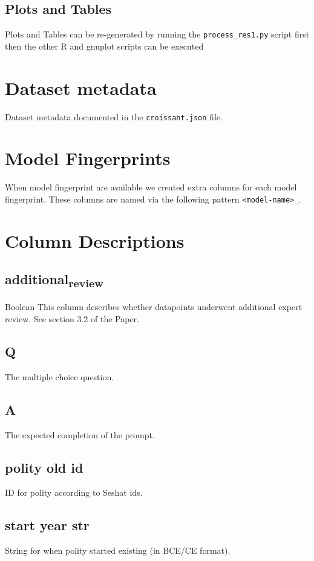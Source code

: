 \documentclass[11pt]{article}
\begin{document}
\subsection*{Plots and Tables}
\label{sec:org72fd3fe}
Plots and Tables can be re-generated by running the \texttt{process\_res1.py}  script first then the other R and gnuplot scripts can be executed

\section*{Dataset metadata}
\label{sec:org615ccbe}
Dataset metadata documented in the \texttt{croissant.json} file.

\section*{Model Fingerprints}
\label{sec:orgab60e90}
When model fingerprint are available we created extra columns for each model fingerprint. These columns are named via the following pattern \texttt{<model-name>\_<model-fingerprint>}.

\section*{Column Descriptions}
\label{sec:org6cd623f}
\subsection*{additional\textsubscript{review}}
\label{sec:org437a392}
Boolean
This column describes whether datapoints underwent additional expert review. See section 3.2 of the Paper.
\subsection*{Q}
\label{sec:orgce66ef5}
The multiple choice question.
\subsection*{A}
\label{sec:org4392cb0}
The expected completion of the prompt.
\subsection*{polity old id}
\label{sec:orgc7ad5ab}
ID for polity according to Seshat ids.
\subsection*{start year str}
\label{sec:org9eb426c}
String for when polity started existing (in BCE/CE format).
\end{document}
